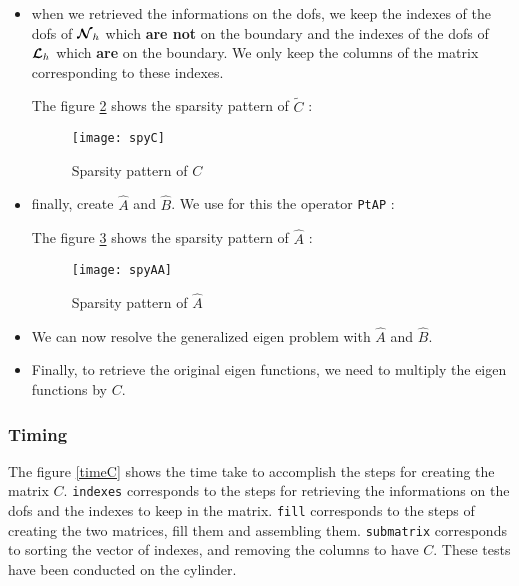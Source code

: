 \begin{itemize}
  
  The figure \ref{spyCTilde} shows the sparsity pattern of $\tilde{C}$ : 
  \begin{figure}[H]
    \centering
    \texttt{[image: spyCTilde]}
    \caption{Sparsity pattern of $\tilde{C}$}
    \label{spyCTilde}
  \end{figure}
\item
  when we retrieved the informations on the dofs, we keep the indexes of the dofs of ${\bm{\mathcal{N}}}_h$ which {\bf are not} on the boundary and the indexes of the dofs of ${\bm{\mathcal{L}}}_h$ which {\bf are} on the boundary. We only keep the columns of the matrix corresponding to these indexes.
  
  The figure \ref{spyC} shows the sparsity pattern of $\tilde{C}$ : 
  \begin{figure}[H]
    \centering
    \texttt{[image: spyC]}
    \caption{Sparsity pattern of $C$}
    \label{spyC}
  \end{figure}
\item
  finally, create $\widehat{A}$ and $\widehat{B}$. We use for this the operator \texttt{PtAP} :
  
  The figure \ref{spyAA} shows the sparsity pattern of $\widehat{A}$ : 
  \begin{figure}[H]
    \centering
    \texttt{[image: spyAA]}
    \caption{Sparsity pattern of $\widehat{A}$}
    \label{spyAA}
  \end{figure}
\item
  We can now resolve the generalized eigen problem with $\widehat{A}$ and $\widehat{B}$.
\item
  Finally, to retrieve the original eigen functions, we need to multiply the eigen functions by $C$.
  
\end{itemize}

\subsubsection{Timing}

The figure \ref{timeC} shows the time take to accomplish the steps for creating the matrix $C$. \texttt{indexes} corresponds to the steps for retrieving the informations on the dofs and the indexes to keep in the matrix. \texttt{fill} corresponds to the steps of creating the two matrices, fill them and assembling them. \texttt{submatrix} corresponds to sorting the vector of indexes, and removing the columns to have $C$. These tests have been conducted on the cylinder.\\


